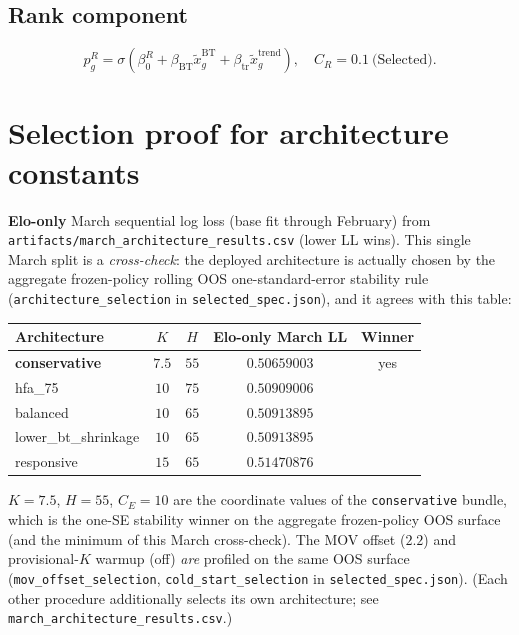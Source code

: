\documentclass[10pt]{article}
\newcommand{\code}[1]{\texttt{#1}}
\begin{document}
\subsection{Rank component}
\[
p_g^{R}
=
\sigma(
\beta_0^{R}
+\beta_{\mathrm{BT}}\tilde x_g^{\mathrm{BT}}
+\beta_{\mathrm{tr}}\tilde x_g^{\mathrm{trend}}
),
\quad C_R=0.1\ \text{(Selected)}.
\]

\section{Selection proof for architecture constants}
\label{tab:march}

\textbf{Elo-only} March sequential log loss (base fit through February) from
\code{artifacts/march\_architecture\_results.csv} (lower LL wins). This single
March split is a \emph{cross-check}: the deployed architecture is actually chosen
by the aggregate frozen-policy rolling OOS one-standard-error stability rule
(\code{architecture\_selection} in \code{selected\_spec.json}), and it agrees with
this table:

\begin{center}
\begin{tabular}{@{}lcccc@{}}
\toprule
Architecture & \(K\) & \(H\) & Elo-only March LL & Winner \\
\midrule
\textbf{conservative} & \(7.5\) & \(55\) & \(\mathbf{0.50659003}\) & yes \\
hfa\_75 & \(10\) & \(75\) & \(0.50909006\) & \\
balanced & \(10\) & \(65\) & \(0.50913895\) & \\
lower\_bt\_shrinkage & \(10\) & \(65\) & \(0.50913895\) & \\
responsive & \(15\) & \(65\) & \(0.51470876\) & \\
\bottomrule
\end{tabular}
\end{center}

\noindent \(K=7.5\), \(H=55\), \(C_E=10\) are the coordinate values of the
\texttt{conservative} bundle, which is the one-SE stability winner on the
aggregate frozen-policy OOS surface (and the minimum of this March cross-check).
The MOV offset (\(2.2\)) and provisional-\(K\) warmup (off) \emph{are} profiled on
the same OOS surface (\code{mov\_offset\_selection}, \code{cold\_start\_selection}
in \code{selected\_spec.json}). (Each other procedure additionally selects its own
architecture; see \code{march\_architecture\_results.csv}.)
\end{document}

